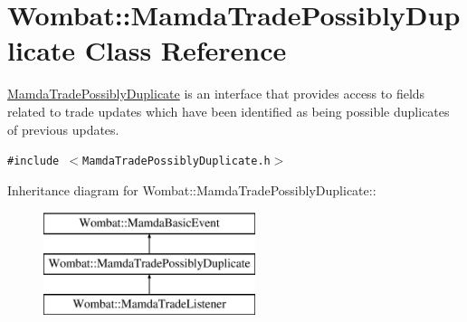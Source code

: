 \hypertarget{classWombat_1_1MamdaTradePossiblyDuplicate}{
\section{Wombat::Mamda\-Trade\-Possibly\-Duplicate Class Reference}
\label{classWombat_1_1MamdaTradePossiblyDuplicate}
}
\hyperlink{classWombat_1_1MamdaTradePossiblyDuplicate}{Mamda\-Trade\-Possibly\-Duplicate} is an interface that provides access to fields related to trade updates which have been identified as being possible duplicates of previous updates.  


{\tt \#include $<$Mamda\-Trade\-Possibly\-Duplicate.h$>$}

Inheritance diagram for Wombat::Mamda\-Trade\-Possibly\-Duplicate::\begin{figure}[H]
\begin{center}
\leavevmode
\includegraphics[height=3cm]{classWombat_1_1MamdaTradePossiblyDuplicate}
\end{center}
\end{figure}
